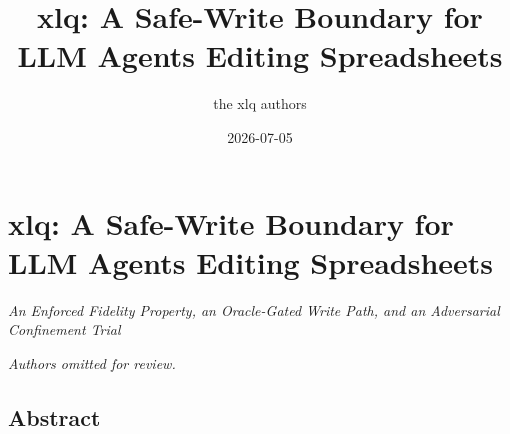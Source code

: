 \documentclass[
]{article}
\title{xlq: A Safe-Write Boundary for LLM Agents Editing Spreadsheets}
\author{the xlq authors}
\date{2026-07-05}
\begin{document}
\maketitle

{
\setcounter{tocdepth}{3}
\tableofcontents
}
\section{xlq: A Safe-Write Boundary for LLM Agents Editing
Spreadsheets}\label{xlq-a-safe-write-boundary-for-llm-agents-editing-spreadsheets}

\emph{An Enforced Fidelity Property, an Oracle-Gated Write Path, and an
Adversarial Confinement Trial}

\emph{Authors omitted for review.}

\subsection{Abstract}\label{abstract}
\end{document}
